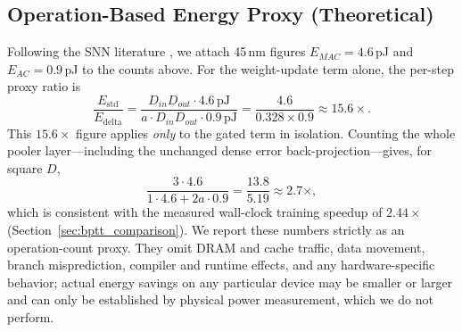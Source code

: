 \documentclass[10pt,journal,compsoc]{IEEEtran}
\begin{document}
\begin{table}[t!]
\caption{Analytical sensitivity of pooler operation counts and theoretical energy proxy speedup across different spike activity rates $a$ ($s = 1-a$ sparsity). Energy proxy assumes 45\,nm CMOS figures ($4.6$\,pJ per MAC, $0.9$\,pJ per AC).}
\label{tab:sparsity_sensitivity}
\begin{center}
\end{center}
\end{table}

\subsection{Operation-Based Energy Proxy (Theoretical)}
\label{sec:energy}
Following the SNN literature \cite{horowitz2014computing, zhou2023spikformer, fang2023spikingjelly}, we attach 45\,nm figures $E_{MAC} = 4.6$\,pJ and $E_{AC} = 0.9$\,pJ to the counts above. For the weight-update term alone, the per-step proxy ratio is
\begin{equation}
\frac{E_{\text{std}}}{E_{\text{delta}}} = \frac{D_{in} D_{out} \cdot 4.6\,\text{pJ}}{a \cdot D_{in} D_{out} \cdot 0.9\,\text{pJ}} = \frac{4.6}{0.328 \times 0.9} \approx 15.6\times.
\label{eq:energy_term}
\end{equation}
This $15.6\times$ figure applies \emph{only} to the gated term in isolation. Counting the whole pooler layer---including the unchanged dense error back-projection---gives, for square $D$,
\begin{equation}
\frac{3 \cdot 4.6}{1 \cdot 4.6 + 2a \cdot 0.9} = \frac{13.8}{5.19} \approx 2.7\times,
\label{eq:energy_layer}
\end{equation}
which is consistent with the measured wall-clock training speedup of $2.44\times$ (Section~\ref{sec:bptt_comparison}). We report these numbers strictly as an operation-count proxy. They omit DRAM and cache traffic, data movement, branch misprediction, compiler and runtime effects, and any hardware-specific behavior; actual energy savings on any particular device may be smaller or larger and can only be established by physical power measurement, which we do not perform.
\end{document}
